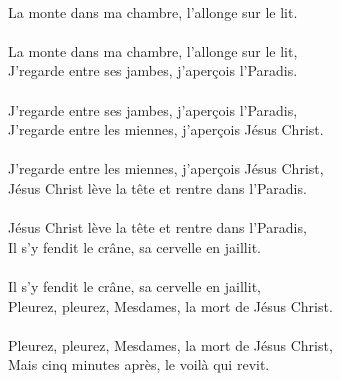 \\La monte dans ma chambre, l'allonge sur le lit.
\\\\La monte dans ma chambre, l'allonge sur le lit,
\\J'regarde entre ses jambes, j'aperçois l'Paradis.
\\\\J'regarde entre ses jambes, j'aperçois l'Paradis,
\\J'regarde entre les miennes, j'aperçois Jésus Christ.
\\\\J'regarde entre les miennes, j'aperçois Jésus Christ,
\\Jésus Christ lève la tête et rentre dans l'Paradis.
\\\\Jésus Christ lève la tête et rentre dans l'Paradis,
\\Il s'y fendit le crâne, sa cervelle en jaillit.
\\\\Il s'y fendit le crâne, sa cervelle en jaillit,
\\Pleurez, pleurez, Mesdames, la mort de Jésus Christ.
\\\\Pleurez, pleurez, Mesdames, la mort de Jésus Christ,
\\Mais cinq minutes après, le voilà qui revit.

\breakpage